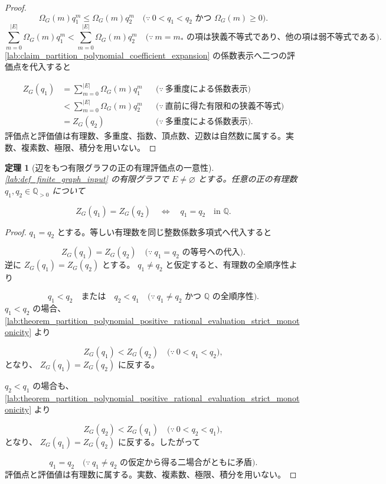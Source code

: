 \documentclass[11pt,a4paper]{article}
\newtheorem{theorem}[definition]{定理}
\theoremstyle{remark}
\begin{document}
\begin{proof}
\[\Omega_G(m)q_1^m\le\Omega_G(m)q_2^m
\quad\bigl(\because\ 0<q_1<q_2\text{ かつ }\Omega_G(m)\ge0\bigr).\]
\[\sum_{m=0}^{|E|}\Omega_G(m)q_1^m
<
\sum_{m=0}^{|E|}\Omega_G(m)q_2^m
\quad\bigl(\because\ m=m_*\text{ の項は狭義不等式であり、他の項は弱不等式である}\bigr).\]
\cref{lab:claim_partition_polynomial_coefficient_expansion}
 の係数表示へ二つの評価点を代入すると

\[\begin{aligned}
Z_G(q_1)
&=\sum_{m=0}^{|E|}\Omega_G(m)q_1^m
&&\bigl(\because\ \text{多重度による係数表示}\bigr)\\
&<\sum_{m=0}^{|E|}\Omega_G(m)q_2^m
&&\bigl(\because\ \text{直前に得た有限和の狭義不等式}\bigr)\\
&=Z_G(q_2)
&&\bigl(\because\ \text{多重度による係数表示}\bigr).
\end{aligned}\]
評価点と評価値は有理数、多重度、指数、頂点数、辺数は自然数に属する。実数、複素数、極限、積分を用いない。

\end{proof}

\begin{theorem}[辺をもつ有限グラフの正の有理評価点の一意性]\label{lab:theorem_partition_polynomial_positive_rational_evaluation_injectivity}
\cref{lab:def_finite_graph_input}
 の有限グラフで 
$E\ne\varnothing$
 とする。任意の正の有理数 
$q_1,q_2\in\mathbb Q_{>0}$
 について

\[Z_G(q_1)=Z_G(q_2)\quad\Longleftrightarrow\quad q_1=q_2\quad\text{in }\mathbb Q.\]
\end{theorem}
\begin{proof}
$q_1=q_2$
 とする。等しい有理数を同じ整数係数多項式へ代入すると

\[Z_G(q_1)=Z_G(q_2)
\quad\bigl(\because\ q_1=q_2\text{ の等号への代入}\bigr).\]
逆に 
$Z_G(q_1)=Z_G(q_2)$
 とする。
$q_1\ne q_2$
 と仮定すると、有理数の全順序性より

\[q_1<q_2\quad\text{または}\quad q_2<q_1
\quad\bigl(\because\ q_1\ne q_2\text{ かつ }\mathbb Q\text{ の全順序性}\bigr).\]
$q_1<q_2$
 の場合、
\cref{lab:theorem_partition_polynomial_positive_rational_evaluation_strict_monotonicity}
 より

\[Z_G(q_1)<Z_G(q_2)
\quad\bigl(\because\ 0<q_1<q_2\bigr),\]
となり、
$Z_G(q_1)=Z_G(q_2)$
 に反する。

$q_2<q_1$
 の場合も、
\cref{lab:theorem_partition_polynomial_positive_rational_evaluation_strict_monotonicity}
 より

\[Z_G(q_2)<Z_G(q_1)
\quad\bigl(\because\ 0<q_2<q_1\bigr),\]
となり、
$Z_G(q_1)=Z_G(q_2)$
 に反する。したがって

\[q_1=q_2
\quad\bigl(\because\ q_1\ne q_2\text{ の仮定から得る二場合がともに矛盾}\bigr).\]
評価点と評価値は有理数に属する。実数、複素数、極限、積分を用いない。

\end{proof}
\end{document}
